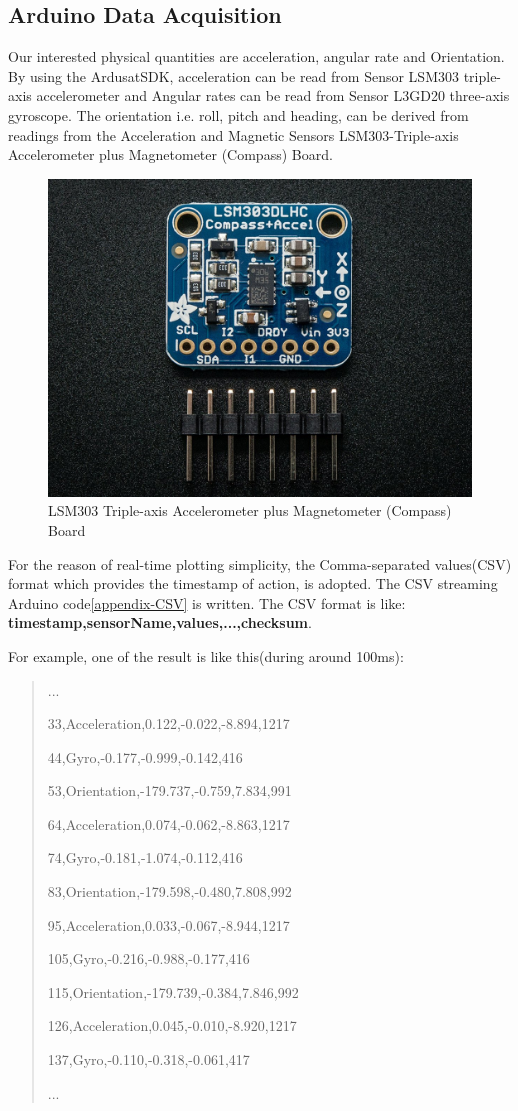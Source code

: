 \subsection{Arduino Data Acquisition}
Our interested physical quantities are acceleration, angular rate and Orientation. By using the ArdusatSDK\cite{ardusatsdk}, acceleration can be read from Sensor LSM303 triple-axis accelerometer and Angular rates can be read from Sensor L3GD20 three-axis gyroscope. The orientation i.e. roll, pitch and heading, can be derived from readings from the Acceleration and Magnetic Sensors LSM303-Triple-axis Accelerometer plus Magnetometer (Compass) Board.

\begin{figure}[!b]
\centering
\includegraphics{fig/DOE/LSM}
\caption{LSM303 Triple-axis Accelerometer plus Magnetometer (Compass) Board}
\end{figure}

For the reason of real-time plotting simplicity, the Comma-separated values(CSV) format which provides the timestamp of action, is adopted. The CSV streaming Arduino code\ref{appendix-CSV} is written. The CSV format is like: \textbf{timestamp,sensorName,values,...,checksum}.

For example, one of the result is like this(during around 100ms):

\begin{quote}
\centering
...

33,Acceleration,0.122,-0.022,-8.894,1217

44,Gyro,-0.177,-0.999,-0.142,416

53,Orientation,-179.737,-0.759,7.834,991

64,Acceleration,0.074,-0.062,-8.863,1217

74,Gyro,-0.181,-1.074,-0.112,416

83,Orientation,-179.598,-0.480,7.808,992

95,Acceleration,0.033,-0.067,-8.944,1217

105,Gyro,-0.216,-0.988,-0.177,416

115,Orientation,-179.739,-0.384,7.846,992

126,Acceleration,0.045,-0.010,-8.920,1217

137,Gyro,-0.110,-0.318,-0.061,417

...
\end{quote}


